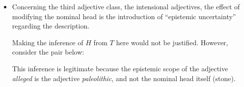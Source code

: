\documentclass[10pt]{article}
\begin{document}
\begin{itemize}
 
\item Concerning the third adjective class, the intensional adjectives, the effect of modifying the nominal head is the introduction of ``epistemic uncertainty'' regarding the description. 


\noindent Making the  inference of $H$ from $T$ here would  not be justified. However,  consider the pair below:


\noindent This inference is legitimate because the epistemic scope of the adjective {\it alleged} is the adjective {\it paleolithic}, and not the nominal head  itself (stone). 
\end{itemize}
\end{document}
